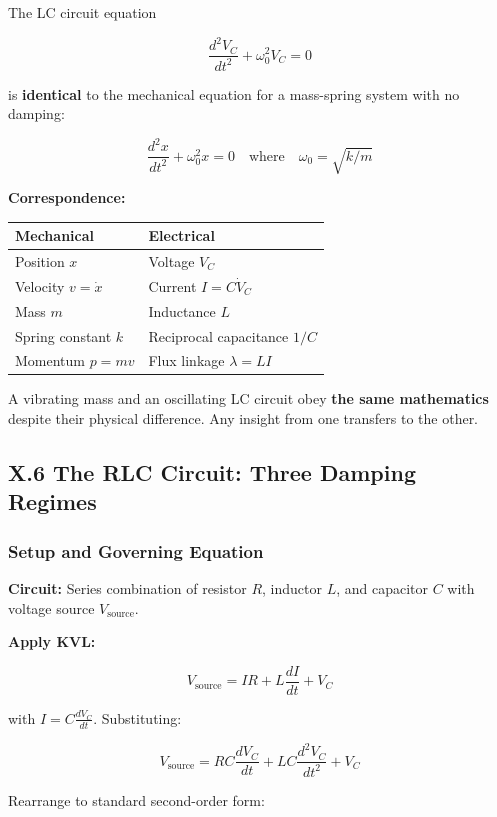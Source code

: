 \documentclass[
]{article}
\begin{document}
The LC circuit equation

\[\frac{d^2V_C}{dt^2} + \omega_0^2 V_C = 0\]

is \textbf{identical} to the mechanical equation for a mass-spring
system with no damping:

\[\frac{d^2x}{dt^2} + \omega_0^2 x = 0 \quad \text{where} \quad \omega_0 = \sqrt{k/m}\]

\textbf{Correspondence:}

\begin{longtable}[]{@{}ll@{}}
\toprule\noalign{}
Mechanical & Electrical \\
\midrule\noalign{}
\endhead
\bottomrule\noalign{}
\endlastfoot
Position \(x\) & Voltage \(V_C\) \\
Velocity \(v = \dot{x}\) & Current \(I = C\dot{V}_C\) \\
Mass \(m\) & Inductance \(L\) \\
Spring constant \(k\) & Reciprocal capacitance \(1/C\) \\
Momentum \(p = mv\) & Flux linkage \(\lambda = LI\) \\
\end{longtable}

A vibrating mass and an oscillating LC circuit obey \textbf{the same
mathematics} despite their physical difference. Any insight from one
transfers to the other.

\subsection{X.6 The RLC Circuit: Three Damping
Regimes}\label{x.6-the-rlc-circuit-three-damping-regimes}

\subsubsection{Setup and Governing
Equation}\label{setup-and-governing-equation-3}

\textbf{Circuit:} Series combination of resistor \(R\), inductor \(L\),
and capacitor \(C\) with voltage source \(V_{\text{source}}\).

\textbf{Apply KVL:}

\[V_{\text{source}} = IR + L\frac{dI}{dt} + V_C\]

with \(I = C\frac{dV_C}{dt}\). Substituting:

\[V_{\text{source}} = RC\frac{dV_C}{dt} + LC\frac{d^2V_C}{dt^2} + V_C\]

Rearrange to standard second-order form:
\end{document}
